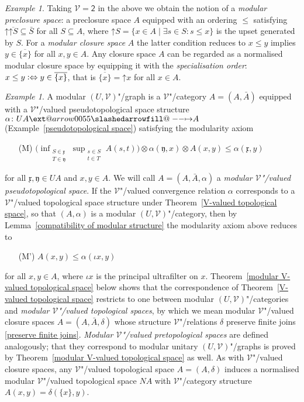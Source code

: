 \documentclass[preprint, a4paper]{elsarticle}
\makeatletter
\def\slashedarrowfill@#1#2#3#4#5{%
  $\m@th\thickmuskip0mu\medmuskip\thickmuskip\thinmuskip\thickmuskip
   \relax#5#1\mkern-7mu%
   \cleaders\hbox{$#5\mkern-2mu#2\mkern-2mu$}\hfill
   \mathclap{#3}\mathclap{#2}%
   \cleaders\hbox{$#5\mkern-2mu#2\mkern-2mu$}\hfill
   \mkern-7mu#4$%
}
\def\rightslashedarrowfill@{%
  \slashedarrowfill@\relbar\relbar\mapstochar\rightarrow}
\newcommand\xslashedrightarrow[2][]{%
  \ext@arrow 0055{\rightslashedarrowfill@}{#1}{#2}}
\def\slashedrightarrow{\xslashedrightarrow{}}
\theoremstyle{definition}
\theoremstyle{remark}
\newtheorem{example}[theorem]{Example}
\providecommand{\exref}[1]{Example~\ref{#1}}
\providecommand{\lemref}[1]{Lemma~\ref{#1}}
\providecommand{\thmref}[1]{Theorem~\ref{#1}}
\newcommand\defeq{\mathrel{\vcentcolon\Leftrightarrow}}
\providecommand{\tens}{\otimes}
\providecommand{\mf}[1]{\mathfrak{#1}}
\providecommand{\brcs}[1]{\lbrace #1 \rbrace}
\providecommand{\bigpars}[1]{\bigl(#1\bigr)}
\providecommand{\set}[1]{\brcs{#1}}
\providecommand{\upset}{\mathord\uparrow}
\providecommand{\hmap}[3]{#1\colon#2\slashedrightarrow#3}
\providecommand{\catvar}[1]{\mathcal{#1}}
\providecommand{\2}{\mathsf 2}
\providecommand{\V}{\catvar V}
\makeatother
\begin{document}
\begin{example}
  Taking $\V = \2$ in the above we obtain the notion of a \emph{modular preclosure space}: a preclosure space $A$ equipped with an ordering $\leq$ satisfying $\upset \overline{\upset S} \subseteq \bar S$ for all $S \subseteq A$, where $\upset S = \set{x \in A \mid \exists s \in S\colon s \leq x}$ is the upset generated by $S$. For a \emph{modular closure space} $A$ the latter condition reduces to $x \leq y$ implies $y \in \overline{\set x}$ for all $x, y \in A$. Any closure space $A$ can be regarded as a normalised modular closure space by equipping it with the \emph{specialisation order}: $x \leq y \defeq y \in \overline{\set x}$, that is $\overline{\set x} = \upset x$ for all $x \in A$.
	\end{example}
	
	\begin{example}	\label{modular (U, V)-category}
		A modular $(U, \V)$"/graph is a $\V$"/category $A = (A, \bar A)$ equipped with a $\V$"/valued pseudotopological space structure $\hmap\alpha{UA}A$ (\exref{pseudotopological space}) satisfying the modularity axiom
		\begin{enumerate}
			\item[(M)] $\bigpars{\inf_{\substack{S \in \mf x \\ T \in \mf y}}\sup_{\substack{s \in S \\ t \in T}} A(s, t)} \tens \alpha(\mf y, x) \tens A(x, y) \leq \alpha(\mf x, y)$
		\end{enumerate}
		for all $\mf x, \mf y \in UA$ and $x, y \in A$. We will call $A = (A, \bar A, \alpha)$ a \emph{modular $\V$"/valued pseudotopological space}. If the $\V$"/valued convergence relation $\alpha$ corresponds to a $\V$"/valued topological space structure under \thmref{V-valued topological space}, so that $(A, \alpha)$ is a modular $(U, \V)$"/category, then by \lemref{compatibility of modular structure} the modularity axiom above reduces to
		\begin{enumerate}
			\item[(M')] $A(x, y) \leq \alpha(\iota x, y)$
		\end{enumerate}
		for all $x, y \in A$, where $\iota x$ is the principal ultrafilter on $x$. \thmref{modular V-valued topological space} below shows that the correspondence of \thmref{V-valued topological space} restricts to one between modular $(U, \V)$"/categories and \emph{modular $\V$"/valued topological spaces}, by which we mean modular $\V$"/valued closure spaces $A = (A, \bar A, \delta)$ whose structure $\V$"/relations $\delta$ preserve finite joins \eqref{preserve finite joins}. \emph{Modular $\V$"/valued pretopological spaces} are defined analogously; that they correspond to modular unitary $(U, \V)$"/graphs is proved by \thmref{modular V-valued topological space} as well. As with $\V$"/valued closure spaces, any $\V$"/valued topological space $A = (A, \delta)$ induces a normalised modular $\V$"/valued topological space $NA$ with $\V$"/category structure $A(x, y) = \delta(\set x, y)$.
		

\end{example}
\end{document}
